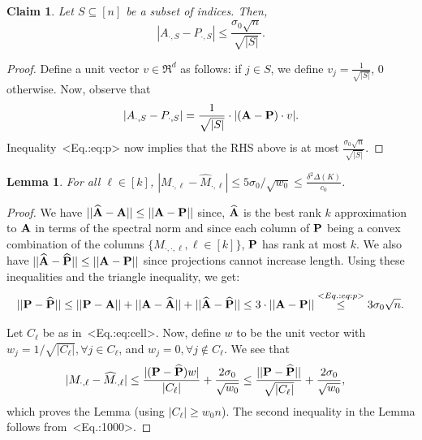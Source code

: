\documentclass[11pt,letterpaper]{article}
\def\eqref#1{<Eq.:#1>}%
\newtheorem{lemma}[theorem]{Lemma}
\newtheorem{claim}[theorem]{Claim}
\theoremstyle{definition}
\theoremstyle{remark}
\newcommand{\cE}{{\cal E}}
\newcommand{\bP}{{\bf P}}
\newcommand{\bA}{{\bf A}}
\newcommand{\hatM}{{\widehat M}}
\newcommand{\Mdot}[1]{{M_{\cdot, #1}}}
\newcommand{\hMdot}[1]{{\hatM_{\cdot, #1}}}
\begin{document}
\begin{claim}
\label{cl:sum}
Let $S \subseteq [n]$ be a subset of indices. Then, $$|A_{\cdot, S} - P_{\cdot, S}| \leq \frac{\sigma_0 \sqrt n}{\sqrt{|S|}}. $$
\end{claim}
\begin{proof}
Define a unit vector $v \in \Re^d$ as follows: if $j \in S$, we define $v_j = \frac{1}{\sqrt{|S|}}$, 0 otherwise. Now, observe that 
$$|A_{\cdot, S} - P_{\cdot, S}| = \frac{1}{\sqrt{|S|}} \cdot |(\bA - \bP) \cdot v|. $$
Inequality~\eqref{eq:p} now implies that the RHS above is at most 
$\frac{\sigma_0 \sqrt{n}}{\sqrt{|S|}}.$
\end{proof}


\begin{lemma}
\label{lem:close}
For all $\ell\in [k]$, 
$|\Mdot{\ell}-\hMdot{\ell}|\leq 5 \sigma_0/\sqrt{w_0} \leq \frac{\delta^2 \Delta(K)}{c_0}$.
\end{lemma}

\begin{proof}
We have $||\widehat{\bA}-\bA||\leq ||\bA-\bP||$ since, $\widehat{\bA}$ is the best rank $k$ approximation to $\bA$ in terms of the spectral norm and since each column of $\bP$ being a convex combination of the columns $\{ \Mdot{\cdot,\ell},\ell\in [k]\}$,
$\bP$ has rank at most $k$. We also have $||\widehat{\bA}-\widehat{\bP}||\leq ||\bA-\bP||$ since projections cannot increase length. Using these inequalities and the triangle inequality, we get: 
$$||\bP-\widehat{\bP}||\leq ||\bP-\bA||+||\bA-\widehat{\bA}||+||\widehat{\bA}-\widehat{\bP}||\leq 3 \cdot ||\bA-\bP|| \stackrel{\eqref{eq:p}}{\leq} 3\sigma_0\sqrt n.$$ 

Let $C_\ell$ be as in~\eqref{eq:cell}.  
 Now, define $w$ to be the unit vector with $w_j=1/\sqrt{|C_\ell|}, \forall j\in C_\ell$, and $w_j=0, \forall j\notin C_\ell$. We see that 
\begin{align*}
& |\Mdot{\ell}-\hMdot{\ell}|\leq \frac{|(\bP-\widehat{\bP})w|}{|C_\ell|}+\frac{2\sigma_0}{\sqrt{w_0}} 
\leq \frac{||\bP -\widehat {\bP }||}{\sqrt{|C_\ell |}} +\frac{2\sigma_0}{\sqrt{w_0}},
\end{align*}
 which proves the Lemma (using $|C_\ell| \geq w_0 n$). The second inequality in the Lemma follows from~\eqref{1000}.
\end{proof}
\end{document}
